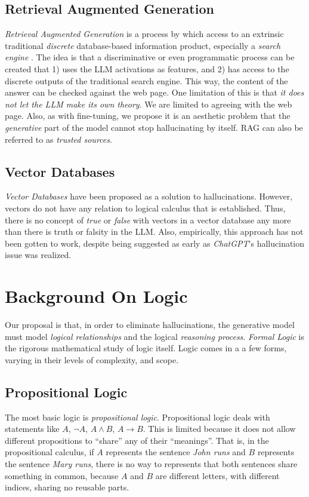 \documentclass[12pt]{article}
\begin{document}
\subsection{Retrieval Augmented Generation}
{\em Retrieval Augmented Generation} is a process by which access to an extrinsic traditional {\em discrete} database-based information
product, especially a {\em search engine} \cite{lewis2013combined:2020}.
The idea is that a discriminative or even programmatic process can be created that 1) uses the LLM activations as features, and 2) has access to the discrete outputs of the traditional search engine.
This way, the content of the answer can be checked against the web page.
One limitation of this is that {\em it does not let the LLM make its own theory}.
We are limited to agreeing with the web page.
Also, as with fine-tuning, we propose it is an aesthetic problem that the {\em generative} part of the model cannot stop hallucinating by itself.
RAG can also be referred to as {\em trusted sources}.
\subsection{Vector Databases}
{\em Vector Databases} have been proposed as a solution to hallucinations.
However, vectors do not have any relation to logical calculus that is established.
Thus, there is no concept of {\em true} or {\em false} with vectors in a vector database any more than there is truth or falsity in the LLM.
Also, empirically, this approach has not been gotten to work, despite being suggested as early as {\em ChatGPT}'s hallucination issue was realized.
\section{Background On Logic}
Our proposal is that, in order to eliminate hallucinations, the generative model must model {\em logical relationships} and the logical {\em reasoning process}.
{\em Formal Logic} is the rigorous mathematical study of logic itself.
Logic comes in a a few forms, varying in their levels of complexity, and scope.

\subsection{Propositional Logic}
The most basic logic is {\em propositional logic}.
Propositional logic deals with statements like $A$, $\neg A$, $A \wedge B$, $A \rightarrow B$.
This is limited because it does not allow different propositions to ``share'' any of their ``meanings''.
That is, in the propositional calculus, if $A$ represents the sentence {\em John runs} and $B$ represents
the sentence {\em Mary runs}, there is no way to represents that both sentences share something
in common, because $A$ and $B$ are different letters, with different indices, sharing no reusable parts.
\end{document}
